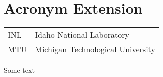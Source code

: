
\chapter{\label{acronym-extension}Acronym Extension}
\begin{tabulary}{\linewidth}{LL}
INL&Idaho National Laboratory\\MTU&Michigan Technological University\\
\end{tabulary}

\par 
\par 
\par Some text 
\par  